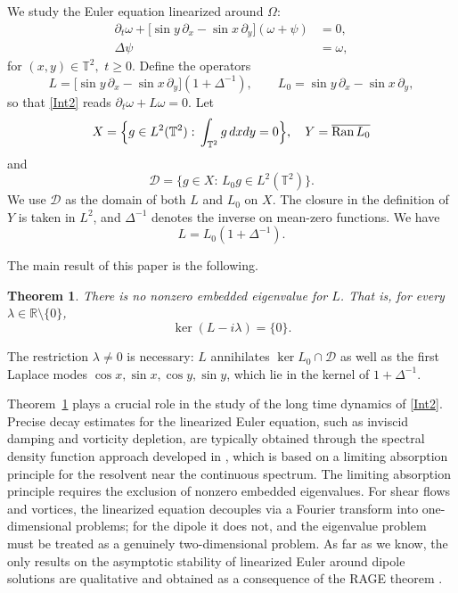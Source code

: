 \documentclass[reqno,11pt]{amsart}
\numberwithin{equation}{section}
\newtheorem{theorem}{Theorem}[section]
\theoremstyle{remark}
\newcommand{\T}{\mathbb T}
\newcommand{\R}{\mathbb R}
\begin{document}
We study the Euler equation linearized around $\Omega$:
\begin{equation}\label{Int2}
    \begin{split}
        \partial_t\omega+\Big[\sin y \,\partial_x - \sin x \,\partial_y\Big](\omega+\psi)&=0,\\
        \Delta\psi &=\omega,
    \end{split}
\end{equation}
for $(x,y)\in\T^2,\,
\,t\ge0$. Define the operators
\begin{equation}\label{Intm1}
L = \Big[\sin y \,\partial_x - \sin x \,\partial_y\Big](1+\Delta^{-1}), \qquad L_0=\sin y \,\partial_x - \sin x \,\partial_y,
\end{equation}
so that \eqref{Int2} reads $\partial_t\omega+L\omega=0$. Let
\begin{equation}\label{Intm2}
    X = \Big\{g\in L^2(\T^2):\, \int_{\T^2}g\,dxdy=0\Big\},\quad Y=\overline{{\rm Ran}\,L_0}
\end{equation}
and
\begin{equation}\label{Intm3}
    \mathcal{D}=\Big\{g\in X:\, L_0g\in L^2(\T^2)\Big\}.
\end{equation}
We use $\mathcal D$ as the domain of both $L$ and $L_0$ on $X$.
The closure in the definition of $Y$ is taken in $L^2$, and
$\Delta^{-1}$ denotes the inverse on mean-zero functions. We have
\begin{equation}\label{Intm4}
    L = L_0 (1+\Delta^{-1}).
\end{equation}

The main result of this paper is the following.
\begin{theorem}\label{Intm6}
There is no nonzero embedded eigenvalue for $L$. That is, for every $\lambda\in\R\setminus\{0\}$,
\[
 \ker(L-i\lambda)=\{0\}.
\]
\end{theorem}

The restriction $\lambda\ne0$ is necessary: $L$ annihilates
$\ker L_0\cap\mathcal D$ as well as the first Laplace modes
$\cos x,\sin x,\cos y,\sin y$, which lie in the kernel of
$1+\Delta^{-1}$.

Theorem~\ref{Intm6} plays a crucial role in the study of the long
time dynamics of \eqref{Int2}. Precise decay estimates for the
linearized Euler equation, such as inviscid damping and vorticity
depletion, are typically obtained through the spectral density
function approach developed in \cite{JiaSIMA,JiaG,JiaVortex,Iyer},
which is based on a limiting absorption principle for the resolvent
near the continuous spectrum. The limiting absorption principle
requires the exclusion of nonzero embedded eigenvalues.
For shear flows and vortices, the linearized equation decouples via
a Fourier transform into one-dimensional problems; for the dipole it
does not, and the eigenvalue problem must be treated as a genuinely
two-dimensional problem. As far as we know, the only results on the
asymptotic stability of linearized Euler around dipole solutions are
qualitative and obtained as a consequence of the RAGE theorem
\cite{Zhiwu3}.
\end{document}
